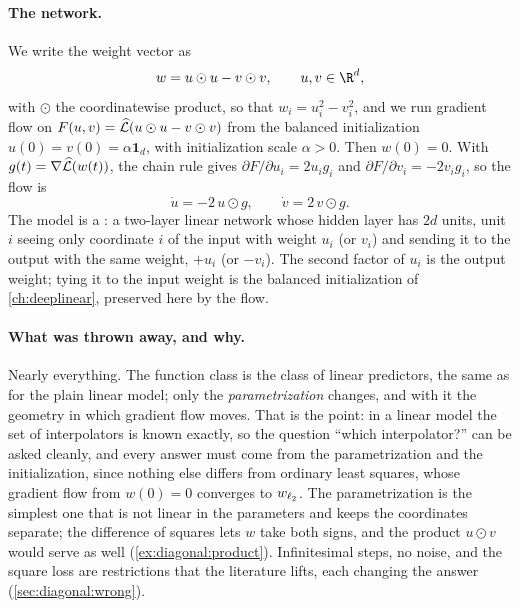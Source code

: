 \begin{refsection}
\paragraph{The network.} We write the weight vector as
\begin{equation}\label{eq:diagonal:param}
  w=u\odot u-v\odot v,\qquad u,v\in\R^d,
\end{equation}
with $\odot$ the coordinatewise product, so that $w_i=u_i^2-v_i^2$, and we run gradient flow on $F(u,v)=\widehat{\mathcal{L}}(u\odot u-v\odot v)$ from the balanced initialization $u(0)=v(0)=\alpha\mathbf 1_d$, with initialization scale $\alpha>0$. Then $w(0)=0$. With $g(t)=\nabla\widehat{\mathcal{L}}(w(t))$, the chain rule gives $\partial F/\partial u_i=2u_ig_i$ and $\partial F/\partial v_i=-2v_ig_i$, so the flow is
\begin{equation}\label{eq:diagonal:flow}
  \dot u=-2\,u\odot g,\qquad \dot v=2\,v\odot g .
\end{equation}
The model is a : a two-layer linear network whose hidden layer has $2d$ units, unit $i$ seeing only coordinate $i$ of the input with weight $u_i$ (or $v_i$) and sending it to the output with the same weight, $+u_i$ (or $-v_i$). The second factor of $u_i$ is the output weight; tying it to the input weight is the balanced initialization of \cref{ch:deeplinear}, preserved here by the flow.

\paragraph{What was thrown away, and why.} Nearly everything. The function class is the class of linear predictors, the same as for the plain linear model; only the \emph{parametrization} changes, and with it the geometry in which gradient flow moves. That is the point: in a linear model the set of interpolators is known exactly, so the question ``which interpolator?'' can be asked cleanly, and every answer must come from the parametrization and the initialization, since nothing else differs from ordinary least squares, whose gradient flow from $w(0)=0$ converges to $w_{\ell_{2}}$. The parametrization is the simplest one that is not linear in the parameters and keeps the coordinates separate; the difference of squares lets $w$ take both signs, and the product $u\odot v$ would serve as well (\cref{ex:diagonal:product}). Infinitesimal steps, no noise, and the square loss are restrictions that the literature lifts, each changing the answer (\cref{sec:diagonal:wrong}).


\end{refsection}
